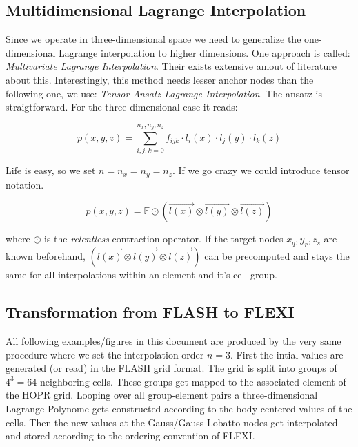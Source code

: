 \subsection{Multidimensional Lagrange Interpolation}

Since we operate in three-dimensional space we need to generalize
the one-dimensional Lagrange interpolation to higher dimensions. One
approach is called: \emph{Multivariate Lagrange Interpolation}. Their
exists extensive amout of literature about this. Interestingly, this
method needs lesser anchor nodes than the following one, we use: \emph{Tensor
Ansatz Lagrange Interpolation}. The ansatz is straigtforward. For the three
dimensional case it reads:

\begin{equation}
\label{eq-tensor-ansatz}
    p(x,y,z) = \sum^{n_x,n_y,n_z}_{i,j,k = 0} f_{ijk} \cdot l_i(x) \cdot l_j(y) \cdot l_k(z)
\end{equation}

Life is easy, so we set $n = n_x = n_y = n_z$. If we go crazy we could
introduce tensor notation.

\begin{equation}
\label{eq-tensor-ansatz}
    p(x,y,z) = \mathbb F \odot (\vec{l(x)} \otimes \vec{l(y)} \otimes \vec{l(z)})
\end{equation}

where $\odot$ is the \emph{relentless} contraction operator. If the target
nodes $x_q, y_r, z_s$ are known beforehand, $(\vec{l(x)} \otimes \vec{l(y)} \otimes \vec{l(z)})$
can be precomputed and stays the same for all interpolations within an element
and it's cell group.

\subsection{Transformation from \textsc{FLASH} to \textsc{FLEXI}}

All following examples/figures in this document are produced by the very same
procedure where we set the interpolation order $n = 3$. First the intial values
are generated (or read) in the FLASH grid format. The grid is split into groups
of $4^3 = 64$ neighboring cells. These groups get mapped to the associated
element of the HOPR grid. Looping over all group-element pairs a
three-dimensional Lagrange Polynome gets constructed according to the
body-centered values of the cells. Then the new values at the
Gauss/Gauss-Lobatto nodes get interpolated and stored according to the ordering
convention of FLEXI.

